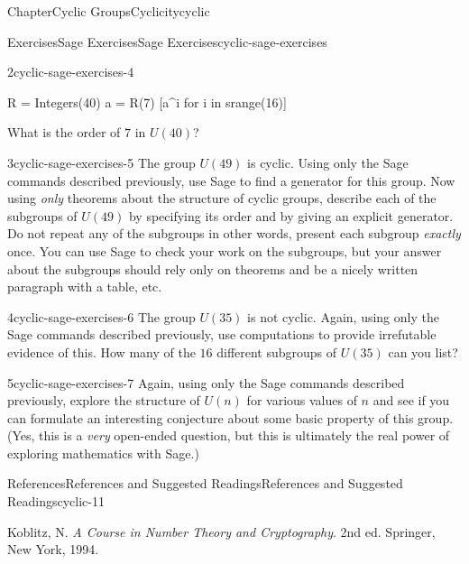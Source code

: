 \documentclass[oneside,10pt,]{book}
\numberwithin{equation}{section}
\begin{document}
\begin{chapterptx}{Chapter}{Cyclic Groups}{}{Cyclicity}{}{}{cyclic}
\begin{exercises-section}{Exercises}{Sage Exercises}{}{Sage Exercises}{}{}{cyclic-sage-exercises}
\begin{divisionexercise}{2}{}{}{cyclic-sage-exercises-4}
\begin{sageinput}
R = Integers(40)
a = R(7)
[a^i for i in srange(16)]
\end{sageinput}
What is the order of \(7\) in \(U(40)\)?%
\end{divisionexercise}%
\begin{divisionexercise}{3}{}{}{cyclic-sage-exercises-5}%
The group \(U(49)\) is cyclic.  Using only the Sage commands described previously, use Sage to find a generator for this group.  Now using \emph{only} theorems about the structure of cyclic groups, describe each of the subgroups of \(U(49)\) by specifying its order and by giving an explicit generator.  Do not repeat any of the subgroups \textemdash{} in other words, present each subgroup \emph{exactly} once.  You can use Sage to check your work on the subgroups, but your answer about the subgroups should rely only on theorems and be a nicely written paragraph with a table, etc.%
\end{divisionexercise}%
\begin{divisionexercise}{4}{}{}{cyclic-sage-exercises-6}%
The group \(U(35)\) is not cyclic.  Again, using only the Sage commands described previously, use computations to provide irrefutable evidence of this.  How many of the \(16\) different subgroups of \(U(35)\) can you list?%
\end{divisionexercise}%
\begin{divisionexercise}{5}{}{}{cyclic-sage-exercises-7}%
Again, using only the Sage commands described previously, explore the structure of \(U(n)\) for various values of \(n\) and see if you can formulate an interesting conjecture about some basic property of this group.  (Yes, this is a \emph{very} open-ended question, but this is ultimately the real power of exploring mathematics with Sage.)%
\end{divisionexercise}%
\end{exercises-section}
%
%
\typeout{************************************************}
\typeout{************************************************}
%
\begin{references-section}{References}{References and Suggested Readings}{}{References and Suggested Readings}{}{}{cyclic-11}
\begin{referencelist}
\hypertarget{cyclic-11-2}{}Koblitz, N. \textit{A Course in Number Theory and Cryptography}. 2nd ed. Springer, New York, 1994.

\end{referencelist}
\end{references-section}
\end{chapterptx}
\end{document}
